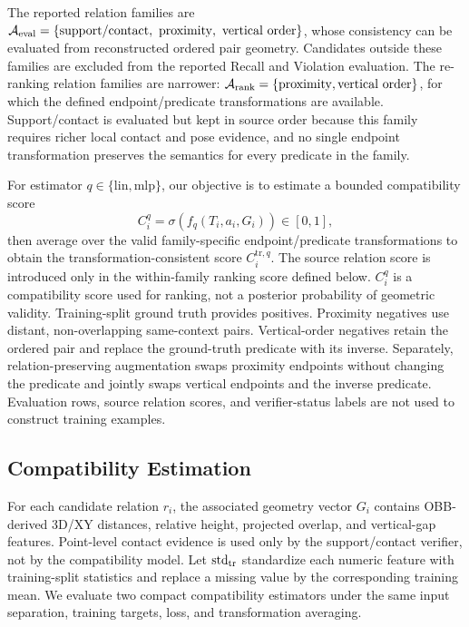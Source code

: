 The reported relation families are 
$\mathcal{A}_{\rm eval}=\{\mathrm{support/contact},\ \mathrm{proximity},\ \mathrm{vertical\ order}\}$, 
whose consistency can be evaluated from reconstructed ordered pair geometry. Candidates outside these families are excluded from the reported Recall and Violation evaluation. The re-ranking relation families are narrower: $\mathcal A_{\rm rank}=\{\mathrm{proximity},\mathrm{vertical\ order}\}$, for which the defined endpoint/predicate transformations are available. Support/contact is evaluated but kept in source order because this family requires richer local contact and pose evidence, and no single endpoint transformation preserves the semantics for every predicate in the family. 

For estimator $q\in\{\mathrm{lin},\mathrm{mlp}\}$, our objective is to estimate a bounded compatibility score
\begin{equation}
C_i^q=\sigma\!\left(f_q(T_i,a_i,G_i)\right)\in[0,1],
\end{equation}
then average over the valid family-specific endpoint/predicate transformations to obtain the transformation-consistent score $C_i^{\mathrm{tr},q}$. The source relation score is introduced only in the within-family ranking score defined below. $C_i^q$ is a compatibility score used for ranking, not a posterior probability of geometric validity. Training-split ground truth provides positives. Proximity negatives use distant, non-overlapping same-context pairs. Vertical-order negatives retain the ordered pair and replace the ground-truth predicate with its inverse. 
Separately, relation-preserving augmentation swaps proximity endpoints without changing the predicate and jointly swaps vertical endpoints and the inverse predicate. Evaluation rows, source relation scores, and verifier-status labels are not used to construct training examples. 

\subsection{Compatibility Estimation}
\label{sec:Compatibility}
For each candidate relation $r_i$, the associated geometry vector $G_i$ contains OBB-derived 3D/XY distances, relative height, projected overlap, and vertical-gap features. Point-level contact evidence is used only by the support/contact verifier, not by the compatibility model. Let $\operatorname{std}_{\rm tr}$ standardize each numeric feature with training-split statistics and replace a missing value by the corresponding training mean. We evaluate two compact compatibility estimators under the same input separation, training targets, loss, and transformation averaging. 

